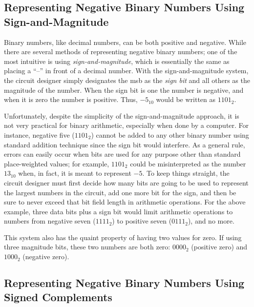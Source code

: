 \subsection{Representing Negative Binary Numbers Using Sign-and-Magnitude}
\label{MO:sub:representing_negative_sign_magnitude}

 Binary numbers, like decimal numbers, can be both positive and negative. While there are several methods of representing negative binary numbers; one of the most intuitive is using \emph{sign-and-magnitude}, which is essentially the same as placing a ``–'' in front of a decimal number. With the sign-and-magnitude system, the circuit designer simply designates the \gls{msb} as the \emph{sign bit} and all others as the magnitude of the number. When the sign bit is one the number is negative, and when it is zero the number is positive. Thus, $ -5_{10} $ would be written as $ 1101_2 $. 

Unfortunately, despite the simplicity of the sign-and-magnitude approach, it is not very practical for binary arithmetic, especially when done by a computer. For instance, negative five ($ 1101_2 $) cannot be added to any other binary number using standard addition technique since the sign bit would interfere. As a general rule, errors can easily occur when bits are used for any purpose other than standard place-weighted values; for example, $ 1101_2 $ could be misinterpreted as the number $ 13_{10} $ when, in fact, it is meant to represent $ -5 $. To keep things straight, the circuit designer must first decide how many bits are going to be used to represent the largest numbers in the circuit, add one more bit for the sign, and then be sure to never exceed that bit field length in arithmetic operations. For the above example, three data bits plus a sign bit would limit arithmetic operations to numbers from negative seven ($ 1111_2 $) to positive seven ($ 0111_2 $), and no more. 

This system also has the quaint property of having two values for zero. If using three magnitude bits, these two numbers are both zero: $ 0000_2 $ (positive zero) and $ 1000_2 $ (negative zero). 

\subsection{Representing Negative Binary Numbers Using Signed Complements }
\label{MO:sub:representing_negative_sign_complement}

